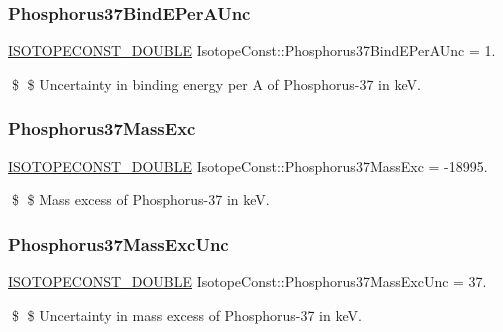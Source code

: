 \subsubsection{\texorpdfstring{Phosphorus37\+Bind\+E\+Per\+A\+Unc}{Phosphorus37BindEPerAUnc}}
{\footnotesize\ttfamily \mbox{\hyperlink{group___isotope_const-_macros_ga8f45a7272ce02c0b4c65c44636ed719a}{I\+S\+O\+T\+O\+P\+E\+C\+O\+N\+S\+T\+\_\+\+D\+O\+U\+B\+LE}} Isotope\+Const\+::\+Phosphorus37\+Bind\+E\+Per\+A\+Unc = 1.}

\$ \$ Uncertainty in binding energy per A of Phosphorus-\/37 in keV. \mbox{\label{group___isotope_const-_phosphorus-_p37_ga1458aec504127a2ef1731cb1f4a8105f}} 
\subsubsection{\texorpdfstring{Phosphorus37\+Mass\+Exc}{Phosphorus37MassExc}}
{\footnotesize\ttfamily \mbox{\hyperlink{group___isotope_const-_macros_ga8f45a7272ce02c0b4c65c44636ed719a}{I\+S\+O\+T\+O\+P\+E\+C\+O\+N\+S\+T\+\_\+\+D\+O\+U\+B\+LE}} Isotope\+Const\+::\+Phosphorus37\+Mass\+Exc = -\/18995.}

\$ \$ Mass excess of Phosphorus-\/37 in keV. \mbox{\label{group___isotope_const-_phosphorus-_p37_ga6e89e665c4e6429e07988951e004cef6}} 
\subsubsection{\texorpdfstring{Phosphorus37\+Mass\+Exc\+Unc}{Phosphorus37MassExcUnc}}
{\footnotesize\ttfamily \mbox{\hyperlink{group___isotope_const-_macros_ga8f45a7272ce02c0b4c65c44636ed719a}{I\+S\+O\+T\+O\+P\+E\+C\+O\+N\+S\+T\+\_\+\+D\+O\+U\+B\+LE}} Isotope\+Const\+::\+Phosphorus37\+Mass\+Exc\+Unc = 37.}

\$ \$ Uncertainty in mass excess of Phosphorus-\/37 in keV. \mbox{\label{group___isotope_const-_phosphorus-_p37_ga37a0356e1a791518f86b4ab11ba81157}} 

